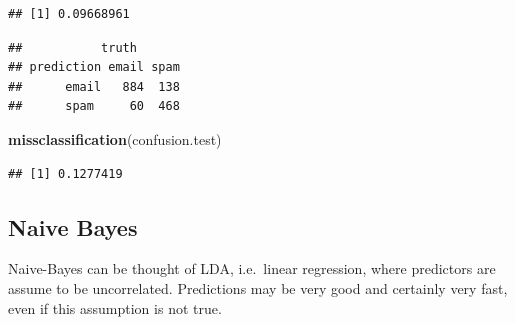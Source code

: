 \documentclass[]{book}
\newenvironment{Shaded}{\begin{snugshade}}{\end{snugshade}}
\newcommand{\CommentTok}[1]{\textcolor[rgb]{0.56,0.35,0.01}{\textit{#1}}}
\newcommand{\DataTypeTok}[1]{\textcolor[rgb]{0.13,0.29,0.53}{#1}}
\newcommand{\FloatTok}[1]{\textcolor[rgb]{0.00,0.00,0.81}{#1}}
\newcommand{\KeywordTok}[1]{\textcolor[rgb]{0.13,0.29,0.53}{\textbf{#1}}}
\newcommand{\NormalTok}[1]{#1}
\newcommand{\OperatorTok}[1]{\textcolor[rgb]{0.81,0.36,0.00}{\textbf{#1}}}
\newcommand{\StringTok}[1]{\textcolor[rgb]{0.31,0.60,0.02}{#1}}
\theoremstyle{definition}
\theoremstyle{definition}
\theoremstyle{definition}
\theoremstyle{remark}
\begin{document}
\begin{verbatim}
## [1] 0.09668961
\end{verbatim}

\begin{Shaded}
\end{Shaded}

\begin{verbatim}
##           truth
## prediction email spam
##      email   884  138
##      spam     60  468
\end{verbatim}

\begin{Shaded}
\begin{Highlighting}[]
\KeywordTok{missclassification}\NormalTok{(confusion.test)}
\end{Highlighting}
\end{Shaded}

\begin{verbatim}
## [1] 0.1277419
\end{verbatim}

\hypertarget{naive-bayes}{%
\subsection{Naive Bayes}\label{naive-bayes}}

Naive-Bayes can be thought of LDA, i.e.~linear regression, where predictors are assume to be uncorrelated.
Predictions may be very good and certainly very fast, even if this assumption is not true.

\begin{Shaded}
\end{Shaded}
\end{document}
